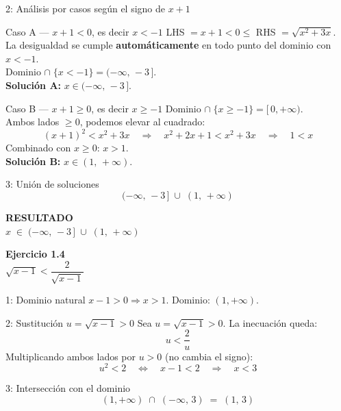 \documentclass[letterpaper, 11pt]{article}
\newcommand{\exheader}[2]{%
    \begin{tcolorbox}[colback=azulFuerte!12, colframe=azulFuerte,
        arc=8pt, boxrule=1.5pt, enhanced]
        {\large\textbf{\color{azulFuerte}Ejercicio #1}} \\[0.4em]
        \centering\LARGE $\displaystyle #2$
    \end{tcolorbox}
    \smallskip}
\newcommand{\resultado}[1]{%
    \begin{tcolorbox}[colback=azulFuerte, colframe=azulFuerte, colupper=white,
        arc=8pt, boxrule=1.5pt, enhanced, drop shadow={black!12}]
        \centering\large\textbf{RESULTADO} \\[0.4em]
        \LARGE $\displaystyle #1$
    \end{tcolorbox}}
\begin{document}
\begin{paso}{2: Análisis por casos según el signo de $x+1$}

\begin{caso}{Caso A --- $x + 1 < 0$, es decir $x < -1$}
LHS $= x+1 < 0 \leq$ RHS $= \sqrt{x^2+3x}$.\\
La desigualdad se cumple \textbf{automáticamente} en todo punto del dominio con $x < -1$.\\
Dominio $\cap\;\{x < -1\} = (-\infty,\,-3\,]$.\\[0.2em]
\textbf{Solución A:} $x \in (-\infty,\,-3\,]$.
\end{caso}

\bigskip

\begin{caso}{Caso B --- $x + 1 \geq 0$, es decir $x \geq -1$}
Dominio $\cap\;\{x \geq -1\} = [\,0,+\infty)$.\\
Ambos lados $\geq 0$, podemos elevar al cuadrado:
\[
    (x+1)^2 < x^2 + 3x
    \quad\Longrightarrow\quad
    x^2 + 2x + 1 < x^2 + 3x
    \quad\Longrightarrow\quad
    1 < x
\]
Combinado con $x \geq 0$: $x > 1$.\\[0.2em]
\textbf{Solución B:} $x \in (1,\,+\infty)$.
\end{caso}

\end{paso}

\begin{paso}{3: Unión de soluciones}
\[
    (-\infty,\,-3\,] \;\cup\; (1,\,+\infty)
\]
\end{paso}

\resultado{x \;\in\; (-\infty,\,-3\,]\;\cup\;(1,\,+\infty)}

\clearpage

\exheader{1.4}{\sqrt{x-1} < \dfrac{2}{\sqrt{x-1}}}

\begin{paso}{1: Dominio natural}
$x - 1 > 0 \Rightarrow x > 1$. Dominio: $(1,+\infty)$.
\end{paso}

\begin{paso}{2: Sustitución $u = \sqrt{x-1} > 0$}
Sea $u = \sqrt{x-1} > 0$. La inecuación queda:
\[
    u < \frac{2}{u}
\]
Multiplicando ambos lados por $u > 0$ (no cambia el signo):
\[
    u^2 < 2
    \quad\Longleftrightarrow\quad
    x - 1 < 2
    \quad\Longrightarrow\quad
    x < 3
\]
\end{paso}

\begin{paso}{3: Intersección con el dominio}
\[
    (1,+\infty) \;\cap\; (-\infty,\,3) \;=\; (1,\,3)
\]
\end{paso}
\end{document}
